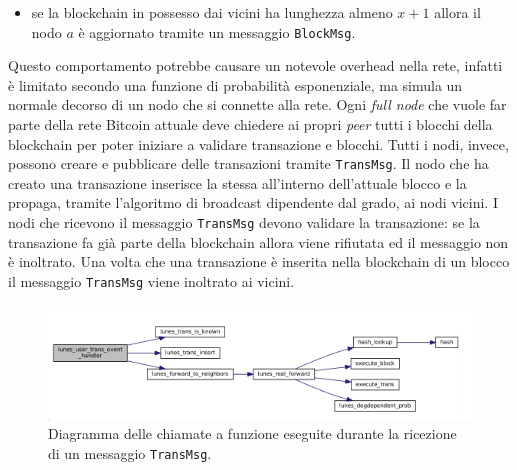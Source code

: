 \begin{code}
\begin{itemize}
    \item se la blockchain in possesso dai vicini ha lunghezza almeno $x+1$ allora il nodo $a$ è aggiornato tramite un messaggio \texttt{BlockMsg}.
\end{itemize}
Questo comportamento potrebbe causare un notevole overhead nella rete, infatti è limitato secondo una funzione di probabilità esponenziale, ma simula un normale decorso di un nodo che si connette alla rete. Ogni \textit{full node} che vuole far parte della rete Bitcoin attuale deve chiedere ai propri \textit{peer} tutti i blocchi della blockchain per poter iniziare a validare transazione e blocchi.\newline
Tutti i nodi, invece, possono creare e pubblicare delle transazioni tramite \texttt{TransMsg}. Il nodo che ha creato una transazione inserisce la stessa all'interno dell'attuale blocco e la propaga, tramite l'algoritmo di broadcast dipendente dal grado, ai nodi vicini. I nodi che ricevono il messaggio \texttt{TransMsg} devono validare la transazione: se la transazione fa già parte della blockchain allora viene rifiutata ed il messaggio non è inoltrato. Una volta che una transazione è inserita nella blockchain di un blocco il messaggio \texttt{TransMsg} viene inoltrato ai vicini.
\begin{figure}[H]
    \centering
    \includegraphics[width=\textwidth]{./images/graphcall_trans.png}
    \caption{Diagramma delle chiamate a funzione eseguite durante la ricezione di un messaggio \texttt{TransMsg}.}
\end{figure}


\end{code}

